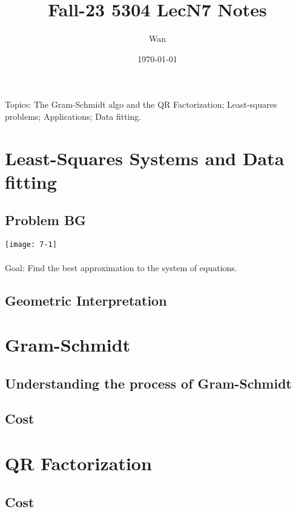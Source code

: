 \documentclass{article}
\begin{document}
\title{Fall-23 5304 LecN7 Notes}
\author{Wan}
\date{\today}
\maketitle

\noindent
Topics: The Gram-Schmidt algo and the QR Factorization; Least-squares problems; Applications; Data fitting.

\section{Least-Squares Systems and Data fitting}
\subsection*{Problem BG}
\texttt{[image: 7-1]}\\
\\
Goal: Find the best approximation to the system of equations.\\

\subsection*{Geometric Interpretation}

\section{Gram-Schmidt}

\subsection*{Understanding the process of Gram-Schmidt}


\subsection*{Cost}



\section{QR Factorization}

\subsection*{Cost}
\end{document}
